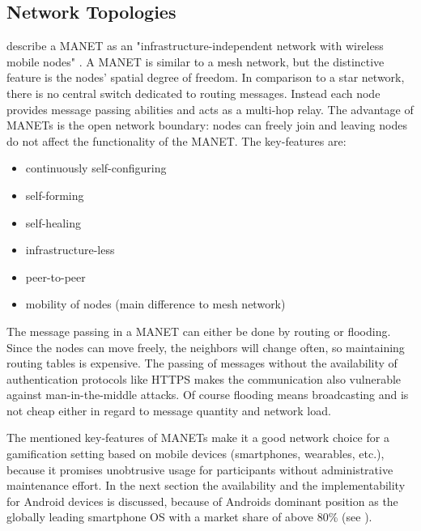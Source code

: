 \subsection{Network Topologies} \label{Network Topologies}

\begingroup 
\sloppy
\textcite{Dorri2015} describe a \gls{MANET} as an "infrastructure-in\-de\-pen\-dent network with wireless mobile nodes" \autocite[p. 15]{Dorri2015}. A \gls{MANET} is similar to a mesh network, but the distinctive feature is the nodes' spatial degree of freedom. In comparison to a star network, there is no central switch dedicated to routing messages. Instead each node provides message passing abilities and acts as a multi-hop relay.
\endgroup
The advantage of \glspl{MANET} is the open network boundary: nodes can freely join and leaving nodes do not affect the functionality of the \gls{MANET}. The key-features are:

\begin{itemize}  
	\item continuously self-configuring
	\item self-forming
	\item self-healing
	\item infrastructure-less
	\item peer-to-peer
	\item  mobility of nodes (main difference to mesh network)
\end{itemize}

The message passing in a \gls{MANET} can either be done by routing or flooding. Since the nodes can move freely, the neighbors will change often, so maintaining routing tables is expensive. The passing of messages without the availability of authentication protocols like \gls{HTTPS} makes the communication also vulnerable against man-in-the-middle attacks. Of course flooding means broadcasting and is not cheap either in regard to message quantity and network load.

The mentioned key-features of \glspl{MANET} make it a good network choice for a gamification setting based on mobile devices (smartphones, wearables, etc.), because it promises unobtrusive usage for participants without administrative maintenance effort. In the next section the availability and the implementability for Android devices is discussed, because of Androids dominant position as the globally leading smartphone \gls{OS} with a market share of above 80\% (see \textcite{Online:Gartner2016}). 

